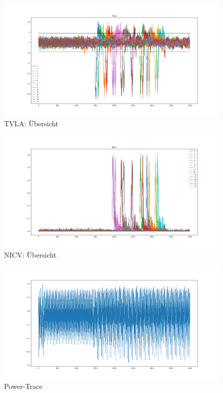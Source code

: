 \documentclass[a4paper,ngerman]{scrreprt}
\begin{document}
\begin{figure}[H]
    \caption{TVLA: Übersicht}
    \label{fig:plot-tvla}

    \includegraphics[width=\textwidth]{img/tvla_specific_overview.png}
\end{figure}

\begin{figure}[H]
    \caption{NICV: Übersicht}
    \label{fig:plot-nicv}

    \includegraphics[width=\textwidth]{img/nicv_overview.png}
\end{figure}

\begin{figure}[H]
    \caption{Power-Trace}
    \label{fig:plot-power-trace}

    \includegraphics[width=\textwidth]{img/power_trace.png}
\end{figure}
\end{document}

